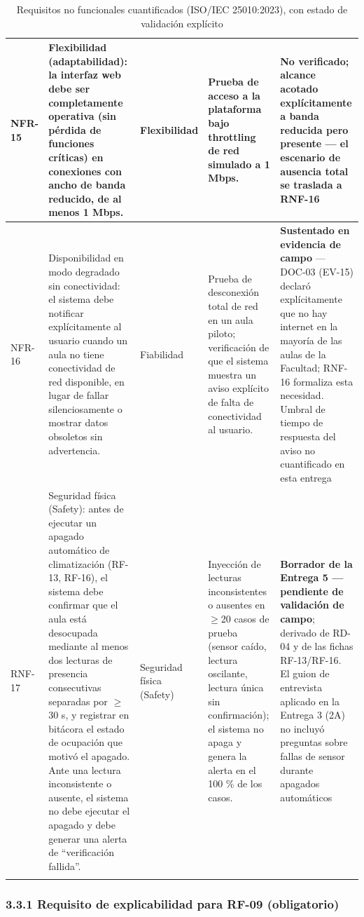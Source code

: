 \begin{longtable}{|p{2.6cm}|p{5.4cm}|p{2.4cm}|p{2.6cm}|p{2.9cm}|}
NFR-15 & Flexibilidad (adaptabilidad): la interfaz web debe ser completamente operativa (sin pérdida de funciones críticas) en conexiones con ancho de banda reducido, de al menos 1 Mbps. & Flexibilidad & Prueba de acceso a la plataforma bajo throttling de red simulado a 1 Mbps. & \textbf{No verificado}; alcance acotado explícitamente a banda reducida pero presente --- el escenario de ausencia total se traslada a RNF-16 \\ \hline
NFR-16 & Disponibilidad en modo degradado sin conectividad: el sistema debe notificar explícitamente al usuario cuando un aula no tiene conectividad de red disponible, en lugar de fallar silenciosamente o mostrar datos obsoletos sin advertencia. & Fiabilidad & Prueba de desconexión total de red en un aula piloto; verificación de que el sistema muestra un aviso explícito de falta de conectividad al usuario. & \textbf{Sustentado en evidencia de campo} --- DOC-03 (EV-15) declaró explícitamente que no hay internet en la mayoría de las aulas de la Facultad; RNF-16 formaliza esta necesidad. Umbral de tiempo de respuesta del aviso no cuantificado en esta entrega \\ \hline
RNF-17 & Seguridad física (Safety): antes de ejecutar un apagado automático de climatización (RF-13, RF-16), el sistema debe confirmar que el aula está desocupada mediante al menos dos lecturas de presencia consecutivas separadas por $\geq$30 s, y registrar en bitácora el estado de ocupación que motivó el apagado. Ante una lectura inconsistente o ausente, el sistema no debe ejecutar el apagado y debe generar una alerta de ``verificación fallida''. & Seguridad física (Safety) & Inyección de lecturas inconsistentes o ausentes en $\geq$20 casos de prueba (sensor caído, lectura oscilante, lectura única sin confirmación); el sistema no apaga y genera la alerta en el 100 \% de los casos. & \textbf{Borrador de la Entrega 5 --- pendiente de validación de campo}; derivado de RD-04 y de las fichas RF-13/RF-16. El guion de entrevista aplicado en la Entrega 3 (2A) no incluyó preguntas sobre fallas de sensor durante apagados automáticos \\ \hline
\caption{Requisitos no funcionales cuantificados (ISO/IEC 25010:2023), con estado de validación explícito}
\end{longtable}
\endgroup

\subsubsection*{3.3.1 Requisito de explicabilidad para RF-09 (obligatorio)}

